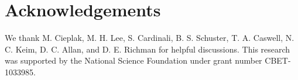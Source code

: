 









\section{Acknowledgements}
We thank M. Cieplak, M. H. Lee, S. Cardinali, B. S. Schuster, T. A. Caswell, N. C. Keim, D. C. Allan, and D. E. Richman for helpful discussions.  This research was supported by the National Science Foundation under grant number CBET-1033985.
